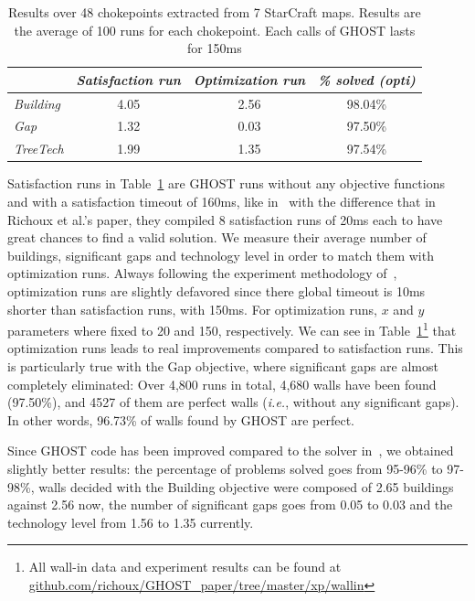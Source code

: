 \documentclass{article}
\newcommand{\ghost}{\textsc{GHOST}\xspace}
\newcommand{\ie}{\textit{i.e.}}
\begin{document}
\begin{table}[ht]
  \caption{Results  over 48  chokepoints  extracted  from 7  StarCraft
    maps. Results  are the  average of 100  runs for  each chokepoint.
    Each calls of \ghost lasts for 150ms} 
    \label{tab:wall}
    \centering
    \begin{tabular}{|l|c|c|c|}
      \cline{2-4}
      \multicolumn{1}{c|}{}   &    {\em   Satisfaction    run}&   {\em
        Optimization run}& {\em \% solved (opti)} \\
      \hline
      {\em Building} & 4.05 & 2.56 & 98.04\% \\
      {\em Gap} & 1.32 & 0.03 & 97.50\% \\ 
      {\em TreeTech} & 1.99 & 1.35 & 97.54\% \\ 
      \hline
    \end{tabular}  
\end{table}
Satisfaction runs in Table~\ref{tab:wall}  are \ghost runs without any
objective functions  and with  a satisfaction  timeout of  160ms, like
in~\cite{RichouxUO14}  with the  difference that  in Richoux  et al.'s
paper, they  compiled 8 satisfaction runs  of 20ms each to  have great
chances to find  a valid solution. We measure their  average number of
buildings, significant  gaps and  technology level  in order  to match
them  with   optimization  runs.   Always  following   the  experiment
methodology  of~\cite{RichouxUO14},  optimization  runs  are  slightly
defavored since there global timeout is 10ms shorter than satisfaction
runs, with 150ms. For optimization  runs, $x$ and $y$ parameters where
fixed   to    20   and   150,    respectively.    We   can    see   in
Table~\ref{tab:wall}\footnote{All wall-in data  and experiment results
  can                   be                  found                   at
  \href{https://github.com/richoux/GHOST\_paper/tree/master/xp/wallin}{github.com/richoux/GHOST\_paper/tree/master/xp/wallin}}
that  optimization  runs  leads   to  real  improvements  compared  to
satisfaction runs. This  is particularly true with  the Gap objective,
where significant  gaps are  almost completely eliminated:  Over 4,800
runs in total, 4,680 walls have been found (97.50\%), and 4527 of them
are perfect walls (\ie, without any significant gaps). In other words,
96.73\% of walls found by \ghost are perfect.

Since  \ghost   code  has  been   improved  compared  to   the  solver
in~\cite{RichouxUO14},  we  obtained   slightly  better  results:  the
percentage  of problems  solved goes  from 95-96\%  to 97-98\%,  walls
decided with  the Building objective  were composed of  2.65 buildings
against 2.56  now, the number  of significant  gaps goes from  0.05 to
0.03 and the technology level from 1.56 to 1.35 currently.
\end{document}
